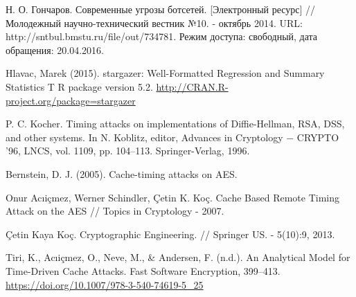 \begingroup
\renewcommand{\section}[2]{\anonsection{Библиографический список}}
\begin{thebibliography}{00}

    Н. О. Гончаров.
    Современные угрозы ботсетей. [Электронный ресурс] // Молодежный научно-технический вестник №10. - октябрь 2014.
    URL: http://sntbul.bmstu.ru/file/out/734781.
    Режим доступа: свободный, дата обращения: 20.04.2016.

  Hlavac, Marek (2015). stargazer: Well-Formatted Regression and Summary Statistics T
  R package version 5.2. \url{http://CRAN.R-project.org/package=stargazer}

  P. C. Kocher. Timing attacks on implementations of Diffie-Hellman, RSA,
  DSS, and other systems. In N. Koblitz, editor, Advances in Cryptology −
  CRYPTO ’96, LNCS, vol. 1109, pp. 104–113. Springer-Verlag, 1996.

  Bernstein, D. J. (2005). Cache-timing attacks on AES.

  Onur Acıiçmez, Werner Schindler, Çetin K. Koç.
  Cache Based Remote Timing Attack on the AES //
  Topics in Cryptology - 2007.

  Çetin Kaya Koç.
  Cryptographic Engineering. //
  Springer US. - 5(10):9, 2013.

  Tiri, K., Acıiçmez, O., Neve, M., \& Andersen, F. (n.d.).
  An Analytical Model for Time-Driven Cache Attacks.
  Fast Software Encryption, 399–413. \url{https://doi.org/10.1007/978-3-540-74619-5_25}



\end{thebibliography}
\endgroup

\clearpage
